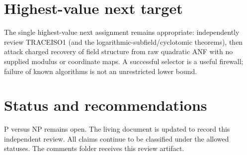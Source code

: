 \documentclass[11pt]{article}
\begin{document}
\section{Highest-value next target}
The single highest-value next assignment remains appropriate: independently review TRACEISO1 (and the logarithmic-subfield/cyclotomic theorems), then attack charged recovery of field structure from raw quadratic ANF with no supplied modulus or coordinate maps. A successful selector is a useful firewall; failure of known algorithms is not an unrestricted lower bound.

\section{Status and recommendations}
P versus NP remains open. The living document is updated to record this independent review. All claims continue to be classified under the allowed statuses. The comments folder receives this review artifact.

\end{document}
